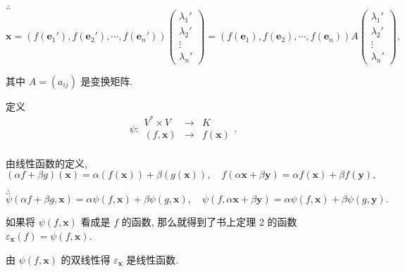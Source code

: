 \documentclass[color=black,device=normal,lang=cn,mode=geye]{elegantnote}
\begin{document}
$\therefore$
\[\boldsymbol{x}=(f(\boldsymbol{e}_1'),f(\boldsymbol{e}_2'),\cdots,f(\boldsymbol{e}_n'))\begin{pmatrix}
    \lambda_1' \\
    \lambda_2' \\
    \vdots \\
    \lambda_n'
\end{pmatrix}=(f(\boldsymbol{e}_1),f(\boldsymbol{e}_2),\cdots,f(\boldsymbol{e}_n))A\begin{pmatrix}
    \lambda_1' \\
    \lambda_2' \\
    \vdots \\
    \lambda_n'
\end{pmatrix},\]

其中 $A=(a_{ij})$ 是变换矩阵.

定义
\[\psi:\begin{array}{rcl}
    V^*\times V & \to & K \\
    (f,\boldsymbol{x}) & \to & f(\boldsymbol{x}) \\
\end{array}.\]

由线性函数的定义,
\[(\alpha f+\beta g)(\boldsymbol{x})=\alpha(f(\boldsymbol{x}))+\beta(g(\boldsymbol{x})),\quad f(\alpha\boldsymbol{x}+\beta\boldsymbol{y})=\alpha f(\boldsymbol{x})+\beta f(\boldsymbol{y}),\]

$\therefore$
\[\psi(\alpha f+\beta g,\boldsymbol{x})=\alpha\psi(f,\boldsymbol{x})+\beta\psi(g,\boldsymbol{x}),\quad\psi(f,\alpha\boldsymbol{x}+\beta\boldsymbol{y})=\alpha\psi(f,\boldsymbol{x})+\beta\psi(g,\boldsymbol{y}).\]

如果将 $\psi(f,\boldsymbol{x})$ 看成是 $f$ 的函数, 那么就得到了书上定理 2 的函数 $\varepsilon_{\boldsymbol{x}}(f)=\psi(f,\boldsymbol{x})$.

由 $\psi(f,\boldsymbol{x})$ 的双线性得 $\varepsilon_{\boldsymbol{x}}$ 是线性函数.
\end{document}
